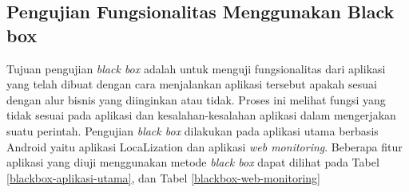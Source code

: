 \subsection{Pengujian Fungsionalitas Menggunakan Black box}
\par Tujuan pengujian \textit{black box} adalah untuk menguji fungsionalitas dari aplikasi yang telah dibuat dengan cara menjalankan aplikasi tersebut apakah sesuai dengan alur bisnis yang diinginkan atau tidak. Proses ini melihat fungsi yang tidak sesuai pada aplikasi dan kesalahan-kesalahan aplikasi dalam mengerjakan suatu perintah. Pengujian \textit{black box} dilakukan pada aplikasi utama berbasis Android yaitu aplikasi LocaLization dan aplikasi \textit{web monitoring}. Beberapa fitur aplikasi yang diuji menggunakan metode \textit{black box} dapat dilihat pada Tabel \ref{blackbox-aplikasi-utama}, dan Tabel \ref{blackbox-web-monitoring}


